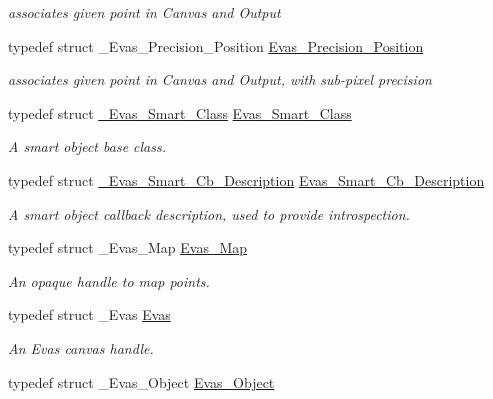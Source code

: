 \begin{DoxyCompactItemize}
\begin{DoxyCompactList}\small\item\em associates given point in Canvas and Output \item\end{DoxyCompactList}\item 
typedef struct \_\-Evas\_\-Precision\_\-Position \hyperlink{Evas_8h_ae62b68e728184674ee011ec19c48fa25}{Evas\_\-Precision\_\-Position}\label{Evas_8h_ae62b68e728184674ee011ec19c48fa25}

\begin{DoxyCompactList}\small\item\em associates given point in Canvas and Output, with sub-\/pixel precision \item\end{DoxyCompactList}\item 
typedef struct \hyperlink{struct__Evas__Smart__Class}{\_\-Evas\_\-Smart\_\-Class} \hyperlink{group__Evas__Smart__Group_gaea15f67e901bf5380cdb67dc1bb43391}{Evas\_\-Smart\_\-Class}\label{group__Evas__Smart__Group_gaea15f67e901bf5380cdb67dc1bb43391}

\begin{DoxyCompactList}\small\item\em A smart object base class. \item\end{DoxyCompactList}\item 
typedef struct \hyperlink{struct__Evas__Smart__Cb__Description}{\_\-Evas\_\-Smart\_\-Cb\_\-Description} \hyperlink{group__Evas__Smart__Group_ga0ad0e7d482d7660e756e275d355e3634}{Evas\_\-Smart\_\-Cb\_\-Description}\label{group__Evas__Smart__Group_ga0ad0e7d482d7660e756e275d355e3634}

\begin{DoxyCompactList}\small\item\em A smart object callback description, used to provide introspection. \item\end{DoxyCompactList}\item 
typedef struct \_\-Evas\_\-Map \hyperlink{group__Evas__Object__Group__Map_gae94fcea124ae4135e8bb15a014b334dc}{Evas\_\-Map}
\begin{DoxyCompactList}\small\item\em An opaque handle to map points. \item\end{DoxyCompactList}\item 
typedef struct \_\-Evas \hyperlink{group__Evas__Canvas_ga5ff87cc4ce6bc43e3b640a6d37f73043}{Evas}
\begin{DoxyCompactList}\small\item\em An Evas canvas handle. \item\end{DoxyCompactList}\item 
typedef struct \_\-Evas\_\-Object \hyperlink{group__Evas__Object__Group_ga9e19e6dd1f517a0ba437c0114d3e7c97}{Evas\_\-Object}\label{group__Evas__Object__Group_ga9e19e6dd1f517a0ba437c0114d3e7c97}


\end{DoxyCompactItemize}

